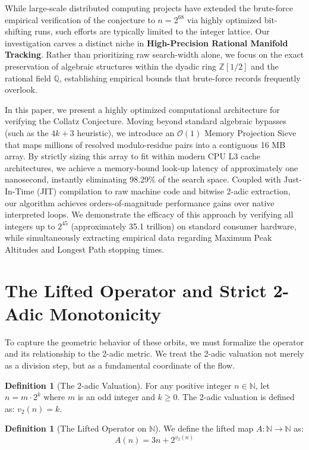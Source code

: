 \documentclass[11pt, a4paper]{article}
\theoremstyle{definition}
\newtheorem{definition}[theorem]{Definition}
\begin{document}
While large-scale distributed computing projects have extended the brute-force empirical verification of the conjecture to $n = 2^{68}$ via highly optimized bit-shifting runs, such efforts are typically limited to the integer lattice. Our investigation carves a distinct niche in \textbf{High-Precision Rational Manifold Tracking}. Rather than prioritizing raw search-width alone, we focus on the exact preservation of algebraic structures within the dyadic ring $\mathbb{Z}[1/2]$ and the rational field $\mathbb{Q}$, establishing empirical bounds that brute-force records frequently overlook.

In this paper, we present a highly optimized computational architecture for verifying the Collatz Conjecture. Moving beyond standard algebraic bypasses (such as the $4k+3$ heuristic), we introduce an $\mathcal{O}(1)$ Memory Projection Sieve that maps millions of resolved modulo-residue pairs into a contiguous 16 MB array. By strictly sizing this array to fit within modern CPU L3 cache architectures, we achieve a memory-bound look-up latency of approximately one nanosecond, instantly eliminating 98.29\% of the search space. Coupled with Just-In-Time (JIT) compilation to raw machine code and bitwise 2-adic extraction, our algorithm achieves orders-of-magnitude performance gains over native interpreted loops. We demonstrate the efficacy of this approach by verifying all integers up to $2^{45}$ (approximately 35.1 trillion) on standard consumer hardware, while simultaneously extracting empirical data regarding Maximum Peak Altitudes and Longest Path stopping times.

\section{The Lifted Operator and Strict 2-Adic Monotonicity}

To capture the geometric behavior of these orbits, we must formalize the operator and its relationship to the 2-adic metric. We treat the 2-adic valuation not merely as a division step, but as a fundamental coordinate of the flow.

\begin{definition}[The 2-adic Valuation]
For any positive integer $n\in\mathbb{N}$, let $n=m\cdot2^{k}$ where $m$ is an odd integer and $k\ge0$. The 2-adic valuation is defined as: $v_{2}(n)=k$.
\end{definition}

\begin{definition}[The Lifted Operator on \texorpdfstring{$\mathbb{N}$}{N}]
We define the lifted map $A:\mathbb{N}\rightarrow\mathbb{N}$ as:
\begin{equation}
A(n)=3n+2^{v_{2}(n)}
\end{equation}
\end{definition}
\end{document}
